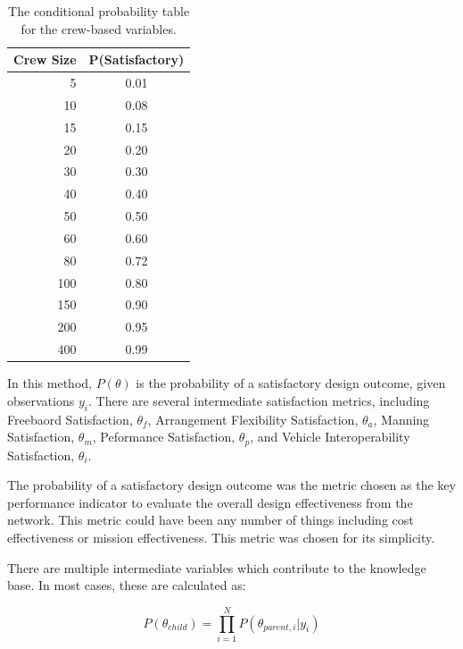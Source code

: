 \documentclass{svproc}
\begin{document}
\begin{table}[htb]
\begin{center}
\setlength\extrarowheight{3.5pt}
\caption{The conditional probability table for the crew-based variables.}
\begin{tabular}{r c}
\hline
Crew Size & P(Satisfactory) \\
\hline
5         & 0.01            \\
10        & 0.08            \\
15        & 0.15            \\
20        & 0.20            \\
30        & 0.30            \\
40        & 0.40            \\
50        & 0.50            \\
60        & 0.60            \\
80        & 0.72            \\
100       & 0.80            \\
150       & 0.90            \\
200       & 0.95            \\
400       & 0.99            \\
\hline
\end{tabular}
\label{table:prob_crew}
\end{center}
\end{table}

In this method, $P(\theta)$ is the probability of a satisfactory design outcome, given observations $y_i$. There are several intermediate satisfaction metrics, including Freebaord Satisfaction, $\theta_f$, Arrangement Flexibility Satisfaction, $\theta_a$, Manning Satisfaction, $\theta_m$, Peformance Satisfaction, $\theta_p$, and Vehicle Interoperability Satisfaction, $\theta_i$. 

The probability of a satisfactory design outcome was the metric chosen as the key performance indicator to evaluate the overall design effectiveness from the network. This metric could have been any number of things including cost effectiveness or mission effectiveness. This metric was chosen for its simplicity. 

There are multiple intermediate variables which contribute to the knowledge base. In most cases, these are calculated as:

\begin{equation}
    P(\theta_{child}) = \prod_{i=1}^N P(\theta_{parent,i}|y_i)
\end{equation}
\end{document}
